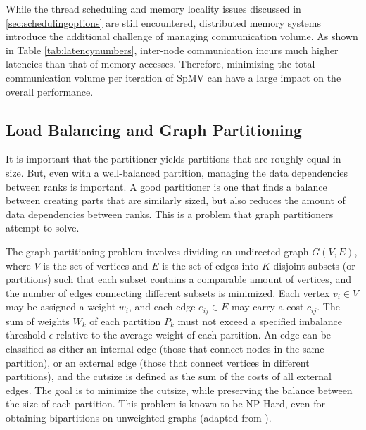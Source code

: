While the thread scheduling and memory locality issues discussed in \ref{sec:schedulingoptions} are still encountered, distributed memory systems introduce the additional challenge of managing communication volume. As shown in Table \ref{tab:latencynumbers}, inter-node communication incurs much higher latencies than that of memory accesses. Therefore, minimizing the total communication volume per iteration of SpMV can have a large impact on the overall performance.



\subsection{Load Balancing and Graph Partitioning}
It is important that the partitioner yields partitions that are roughly equal in size. But, even with a well-balanced partition, managing the data dependencies between ranks is important. A good partitioner is one that finds a balance between creating parts that are similarly sized, but also reduces the amount of data dependencies between ranks. This is a problem that graph partitioners attempt to solve.
\medskip

The graph partitioning problem involves dividing an undirected graph \(G(V,E)\), where \(V\) is the set of vertices and \(E\) is the set of edges into \(K\) disjoint subsets (or partitions) such that each subset contains a comparable amount of vertices, and the number of edges connecting different subsets is minimized. Each vertex \(v_{i} \in V\) may be assigned a weight \(w_{i}\), and each edge \(e_{ij} \in E\) may carry a cost \(c_{ij}\). The sum of weights \(W_{k}\) of each partition \(P_{k}\) must not exceed a specified imbalance threshold \(\epsilon\) relative to the average weight of each partition. An edge can be classified as either an internal edge (those that connect nodes in the same partition), or an external edge (those that connect vertices in different partitions), and the cutsize is defined as the sum of the costs of all external edges. The goal is to minimize the cutsize, while preserving the balance between the size of each partition. This problem is known to be NP-Hard, even for obtaining bipartitions on unweighted graphs (adapted from \cite{hypergraphpartitioning}).
\medskip


